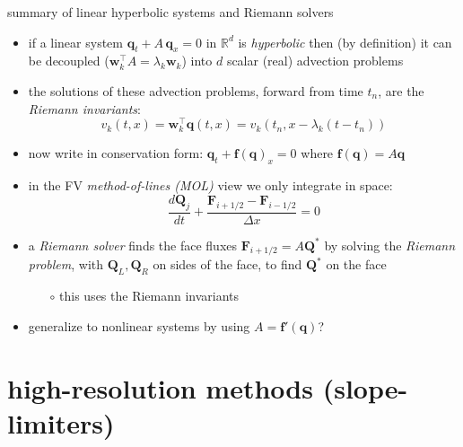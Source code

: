 \documentclass[10pt,dvipsnames,usepdftitle=false,
hyperref={pdftitle = {Finite volume methods},
    pdfauthor = {Ed Bueler}}]{beamer}
\newcommand{\bbf}{\mathbf{f}}
\newcommand{\bq}{\mathbf{q}}
\newcommand{\bw}{\mathbf{w}}
\newcommand{\bF}{\mathbf{F}}
\newcommand{\bQ}{\mathbf{Q}}
\newcommand{\RR}{\mathbb{R}}
\begin{document}
\begin{frame}{summary of linear hyperbolic systems and Riemann solvers}

\begin{itemize}
\item if a linear system $\bq_t + A\, \bq_x=0$ in $\RR^d$ is \alert{\emph{hyperbolic}} then (by definition) it can be decoupled ($\bw_k^\top A = \lambda_k \bw_k$) into $d$ scalar (real) advection problems
\item the solutions of these advection problems, forward from time $t_n$, are the \alert{\emph{Riemann invariants}}:
    $$v_k(t,x) = \bw_k^\top \bq(t,x) = v_k(t_n,x-\lambda_k (t-t_n))$$
\item now write in conservation form: $\bq_t + \bbf(\bq)_x=0$ where $\bbf(\bq) = A\bq$
\item in the FV \alert{\emph{method-of-lines (MOL)}} view we only integrate in space:
    $$\frac{d\bQ_j}{dt} + \frac{\bF_{i+1/2} - \bF_{i-1/2}}{\Delta x} = 0$$
\item a \alert{\emph{Riemann solver}} finds the face fluxes $\bF_{i+1/2}=A \bQ^*$ by solving the \emph{Riemann problem}, with $\bQ_L,\bQ_R$ on sides of the face, to find $\bQ^*$ on the face
    \begin{itemize}
    \item[$\circ$] this uses the Riemann invariants
    \end{itemize}

\bigskip
\footnotesize
\item generalize to nonlinear systems by using $A=\bbf'(\bq)$?
\end{itemize}
\end{frame}


\section{high-resolution methods (slope-limiters)}
\end{document}
